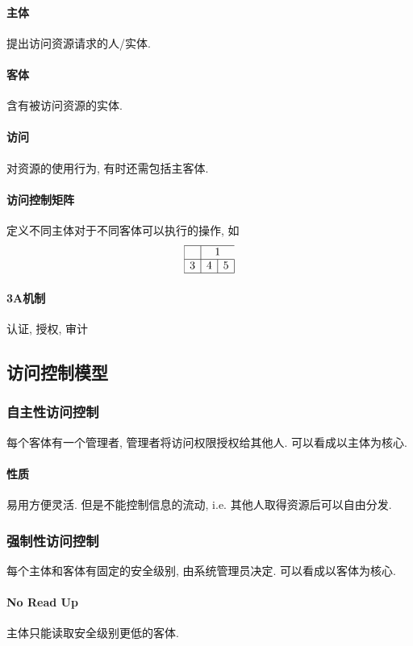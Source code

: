 \documentclass{ctexart}
\begin{document}
\paragraph{主体} 提出访问资源请求的人/实体.
\paragraph{客体} 含有被访问资源的实体.
\paragraph{访问} 对资源的使用行为, 有时还需包括主客体.
\paragraph{访问控制矩阵} 定义不同主体对于不同客体可以执行的操作, 如 \[ \begin{array}{|c|c|c|}
        \hline
        & \multicolumn{2}{c}{1} \\ 
        \hline
        3 & 4 & 5 \\
        \hline
    \end{array} \]

\paragraph{3A机制}  认证, 授权, 审计

\subsection{访问控制模型}
\subsubsection{自主性访问控制} 每个客体有一个管理者, 管理者将访问权限授权给其他人. 可以看成以主体为核心.
\paragraph{性质} 易用方便灵活. 但是不能控制信息的流动, i.e. 其他人取得资源后可以自由分发.
\subsubsection{强制性访问控制} 每个主体和客体有固定的安全级别, 由系统管理员决定. 可以看成以客体为核心.
\paragraph{No Read Up} 主体只能读取安全级别更低的客体.
\end{document}
